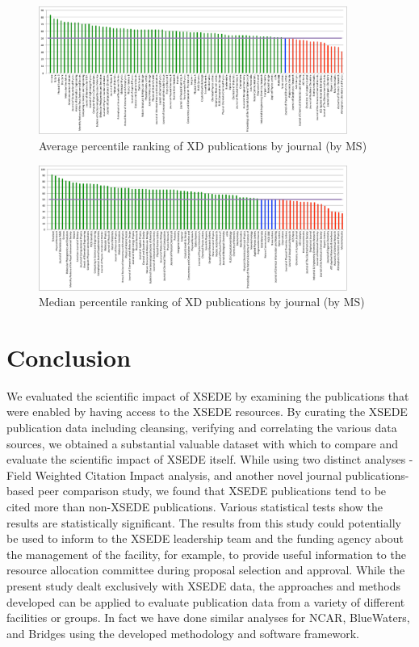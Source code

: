 \documentclass{sig-alternate}
\begin{document}
\begin{figure}[htb!]
  \centering
    \includegraphics[width=0.9\textwidth]{images/ms_peers_byj_mean_10.pdf}
    \caption{Average percentile ranking of XD publications by journal (by MS)}
    \label{F:ms_peers_byj_mean}
\end{figure}

\begin{figure}[htb!]
  \centering
    \includegraphics[width=0.9\textwidth]{images/ms_peers_byj_median_10.pdf}
    \caption{Median percentile ranking of XD publications by journal (by MS)}
    \label{F:ms_peers_byj_median}
\end{figure}

\section{Conclusion} \label{S:conclusion}

We evaluated the scientific impact of XSEDE by examining the
publications that were enabled by having access to the XSEDE
resources. By curating the XSEDE publication data including cleansing,
verifying and correlating the various data sources, we obtained a
substantial valuable dataset with which to compare and evaluate the
scientific impact of XSEDE itself.  While using two distinct analyses
- Field Weighted Citation Impact analysis, and another novel journal
publications-based peer comparison study, we found that XSEDE
publications tend to be cited more than non-XSEDE publications.
Various statistical tests show the results are statistically
significant.  The results from this study could potentially be used to
inform to the XSEDE leadership team and the funding agency about the
management of the facility, for example, to provide useful information
to the resource allocation committee during proposal selection and
approval.  While the present study dealt exclusively with XSEDE data,
the approaches and methods developed can be applied to evaluate
publication data from a variety of different facilities or groups.  In
fact we have done similar analyses for NCAR, BlueWaters, and Bridges
using the developed methodology and software framework.
\end{document}
